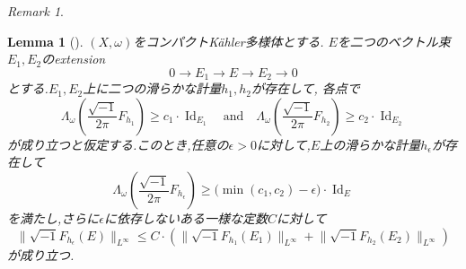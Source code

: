 \documentclass[dvipdfmx,a4paper,11pt]{article} %
\newtheorem{lem}[thm]{Lemma}
\theoremstyle{definition}
\theoremstyle{remark}
\newtheorem{rem}[thm]{Remark}
\numberwithin{equation}{section}
\begin{document}
\begin{rem}
\begin{lem}[{\cite[Lemma 2.6]{Cao13}}]
\label{lem-Cao13-2.6}
$(X,\omega)$をコンパクトK\"ahler多様体とする.
$E$を二つのベクトル束$E_1,E_2$のextension
\[
0\to E_1\to E\to E_2\to 0
\]
とする.$E_1,E_2$上に二つの滑らかな計量$h_1,h_2$が存在して, 各点で
\begin{equation}
\label{eq:lemma26-7}
\Lambda_{\omega}\left(\frac{\sqrt{-1}}{2 \pi}F_{h_1}\right)
\geq c_1\cdot\operatorname{Id}_{E_1}
\quad\text{and}\quad
\Lambda_{\omega}\left(\frac{\sqrt{-1}}{2 \pi}F_{h_2}\right)
\geq c_2\cdot\operatorname{Id}_{E_2}
\end{equation}
が成り立つと仮定する.このとき,任意の$\epsilon>0$に対して,$E$上の滑らかな計量$h_\epsilon$が存在して
\begin{equation}
\label{eq:lemma26-7-2}
\Lambda_{\omega}\left(\frac{\sqrt{-1}}{2 \pi}F_{h_\epsilon}\right)
\geq \bigl(\min(c_1,c_2)-\epsilon\bigr)\cdot\operatorname{Id}_E
\end{equation}
を満たし,さらに$\epsilon$に依存しないある一様な定数$C$に対して
\begin{equation}
\label{eq:lemma26-8}
\lVert\sqrt{-1} F_{h_\epsilon}(E)\rVert_{L^\infty}
\leq
C\cdot
\left(
\lVert \sqrt{-1} F_{h_1}(E_1)\rVert_{L^\infty}
+
\lVert\sqrt{-1} F_{h_2}(E_2)\rVert_{L^\infty}
\right)
\end{equation}
が成り立つ.
\end{lem}


\end{rem}
\end{document}
